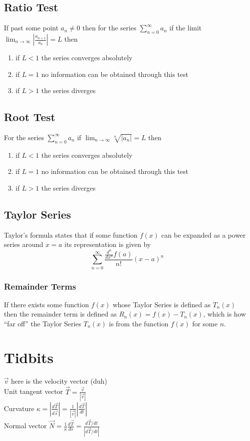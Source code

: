 \documentclass[10pt,landscape,letterpaper]{cheatsheet}
\begin{document}
\subsection*{Ratio Test}
If past some point $a_n\neq 0$ then for the series $\sum_{n=0}^{\infty}a_n$
if the limit $\lim_{n \to \infty} \left|\frac{a_{n+1}}{a_n}\right|=L$ then
\begin{enumerate}[label=(\alph*)]
        \item if $L<1$ the series converges absolutely
        \item if $L=1$ no information can be obtained through this test
        \item if $L>1$ the series diverges
\end{enumerate}
\subsection*{Root Test}
For the series $\sum_{n=0}^{\infty}a_n$ if $\lim_{n \to \infty}\sqrt[n]{|a_n|}=L$ then
\begin{enumerate}[label=(\alph*)]
        \item if $L<1$ the series converges absolutely
        \item if $L=1$ no information can be obtained through this test
        \item if $L>1$ the series diverges
\end{enumerate}
\subsection*{Taylor Series}
Taylor's formula states that if some function $f(x)$ can be expanded as a power series around $x=a$
its representation is given by $$\sum_{n=0}^{\infty}\frac{\frac{d^n}{dx^n}f(a)}{n!}(x-a)^n$$
\subsubsection*{Remainder Terms}
If there exists some function $f(x)$ whose Taylor Series is defined as $T_n(x)$ then the remainder term is
defined as $R_n(x)=f(x)-T_n(x)$, which is how ``far off'' the Taylor Series $T_n(x)$ is from the function $f(x)$
for some $n$.
\section*{Tidbits}
$\vec{v}$ here is the velocity vector (duh)\\
Unit tangent vector $\vec{T}=\frac{\vec{v}}{\left|\vec{v}\right|}$\\
Curvature $\kappa=\left|\frac{d\vec{T}}{d\vec{s}}\right|=\frac{1}{\left|\vec{v}\right|}\left|\frac{d\vec{T}}{dt}\right|$\\
Normal vector $\vec{N}=\frac{1}{\kappa}\frac{d\vec{T}}{ds}=\frac{d\vec{T}/dt}{\left|d\vec{T}/dt\right|}$ 
\end{document}
